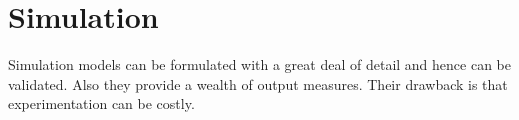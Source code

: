\section{Simulation}
Simulation models
can be formulated with a great deal of detail
and hence can be validated.
Also they provide a wealth of output measures.
Their drawback is that experimentation can be costly.
